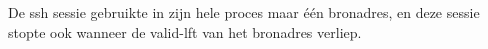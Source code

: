 De ssh sessie gebruikte in zijn hele proces maar één bronadres, en deze sessie stopte ook wanneer de valid-lft van het bronadres verliep. 